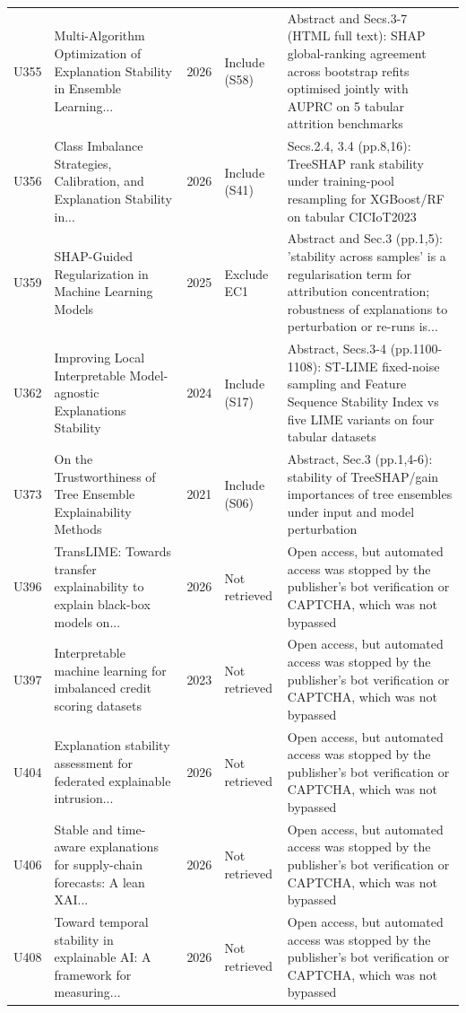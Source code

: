 \begin{longtable}{@{}P{1.0cm}P{6.3cm}P{0.7cm}P{1.6cm}P{6.1cm}@{}}
U355 & Multi-Algorithm Optimization of Explanation Stability in Ensemble Learning... & 2026 & Include (S58) & Abstract and Secs.3-7 (HTML full text): SHAP global-ranking agreement across bootstrap refits optimised jointly with AUPRC on 5 tabular attrition benchmarks \\
U356 & Class Imbalance Strategies, Calibration, and Explanation Stability in... & 2026 & Include (S41) & Secs.2.4, 3.4 (pp.8,16): TreeSHAP rank stability under training-pool resampling for XGBoost/\allowbreak{}RF on tabular CICIoT2023 \\
U359 & SHAP-Guided Regularization in Machine Learning Models & 2025 & Exclude EC1 & Abstract and Sec.3 (pp.1,5): 'stability across samples' is a regularisation term for attribution concentration; robustness of explanations to perturbation or re-runs is... \\
U362 & Improving Local Interpretable Model-agnostic Explanations Stability & 2024 & Include (S17) & Abstract, Secs.3-4 (pp.1100-1108): ST-LIME fixed-noise sampling and Feature Sequence Stability Index vs five LIME variants on four tabular datasets \\
U373 & On the Trustworthiness of Tree Ensemble Explainability Methods & 2021 & Include (S06) & Abstract, Sec.3 (pp.1,4-6): stability of TreeSHAP/\allowbreak{}gain importances of tree ensembles under input and model perturbation \\
U396 & TransLIME: Towards transfer explainability to explain black-box models on... & 2026 & Not retrieved & Open access, but automated access was stopped by the publisher's bot verification or CAPTCHA, which was not bypassed \\
U397 & Interpretable machine learning for imbalanced credit scoring datasets & 2023 & Not retrieved & Open access, but automated access was stopped by the publisher's bot verification or CAPTCHA, which was not bypassed \\
U404 & Explanation stability assessment for federated explainable intrusion... & 2026 & Not retrieved & Open access, but automated access was stopped by the publisher's bot verification or CAPTCHA, which was not bypassed \\
U406 & Stable and time-aware explanations for supply-chain forecasts: A lean XAI... & 2026 & Not retrieved & Open access, but automated access was stopped by the publisher's bot verification or CAPTCHA, which was not bypassed \\
U408 & Toward temporal stability in explainable AI: A framework for measuring... & 2026 & Not retrieved & Open access, but automated access was stopped by the publisher's bot verification or CAPTCHA, which was not bypassed \\

\end{longtable}
